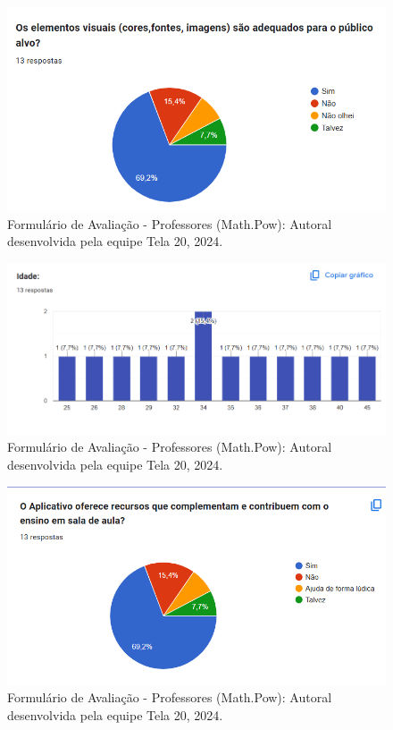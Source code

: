 \documentclass[12pt, openany, oneside, a4paper, english, brazil]{abntex2}   %
\begin{document}
\begin{figure}
    \centering
    \includegraphics{figuras/Formulário Gráficos/Professores/5 Elementos visuais.png}
    \caption{Formulário de Avaliação - Professores (Math.Pow):  Autoral desenvolvida pela equipe Tela 20, 2024.}
    \label{gráfico gerado pelo formulário}
\end{figure}

\begin{figure}
    \centering
    \includegraphics{figuras/Formulário Gráficos/Professores/6 idade.png}
    \caption{Formulário de Avaliação - Professores (Math.Pow):  Autoral desenvolvida pela equipe Tela 20, 2024.}
    \label{gráfico gerado pelo formulário}
\end{figure}

\begin{figure}
    \centering
    \includegraphics{figuras/Formulário Gráficos/Professores/7 O aplicativo oferece recursos que complementem.png}
    \caption{Formulário de Avaliação - Professores (Math.Pow):  Autoral desenvolvida pela equipe Tela 20, 2024.}
    \label{gráfico gerado pelo formulário}
\end{figure}
\end{document}
